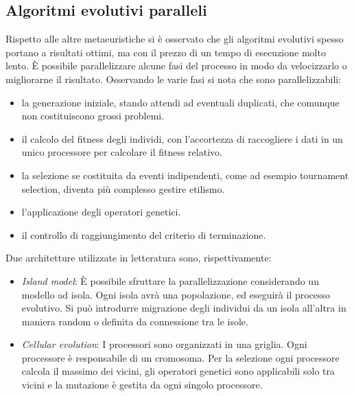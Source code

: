 \documentclass[10pt,a4paper]{article}
\begin{document}
\subsection{Algoritmi evolutivi paralleli}

Rispetto alle altre metaeuristiche si è osservato che gli algoritmi evolutivi spesso portano a risultati ottimi, ma con il prezzo di un tempo di esecuzione molto lento.
È possibile parallelizzare alcune fasi del processo in modo da velocizzarlo o migliorarne il risultato. Osservando le varie fasi si nota che sono parallelizzabili:

\begin{itemize}
\item{la generazione iniziale, stando attendi ad eventuali duplicati, che comunque non costituiscono grossi problemi.}
\item{il calcolo del fitness degli individi, con l’accortezza di raccogliere i dati in un unico processore per calcolare il fitness relativo.}
\item{la selezione se costituita da eventi indipendenti, come ad esempio tournament selection, diventa più complesso gestire etilismo.}
\item{l’applicazione degli operatori genetici.}
\item{il controllo di raggiungimento del criterio di terminazione.}
\end{itemize}

Due architetture utilizzate in letteratura sono, rispettivamente:

\begin{itemize}
\item{\emph{Island model}: È possibile sfruttare la parallelizzazione considerando un modello ad isola. Ogni
isola avrà una popolazione, ed eseguirà il processo evolutivo. Si può introdurre migrazione degli individui da un isola all’altra in maniera random o definita da connessione tra le isole.}
\item{\emph{Cellular evolution}: I processori sono organizzati in una griglia. Ogni processore è responsabile di
un cromosoma.
Per la selezione ogni processore calcola il massimo dei vicini, gli operatori genetici sono applicabili solo tra vicini e la mutazione è gestita da ogni singolo
processore.}
\end{itemize}
\end{document}
